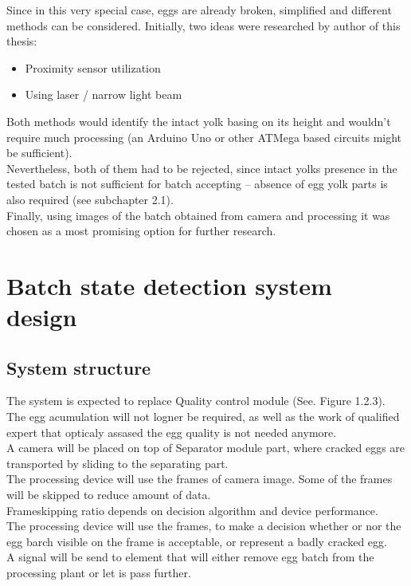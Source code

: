 \documentclass[12pt,twoside,a4paper]{article}
\begin{document}
Since in this very special case, eggs are already broken, simplified and different methods can be considered.
Initially, two ideas were researched by author of this thesis:
\begin{itemize}
\item Proximity sensor utilization
\item Using laser / narrow light beam 
\end{itemize}
Both methods would identify the intact yolk basing on its height and wouldn’t require much processing (an Arduino Uno or other ATMega based circuits might be sufficient).\\
Nevertheless, both of them had to be rejected, since intact yolks presence in the tested batch is not sufficient for batch accepting – absence of egg yolk parts is also required (see subchapter 2.1).\\
Finally, using images of the batch obtained from camera and processing it was chosen as a most promising option for further research.









\section{Batch state detection system design}

\subsection{System structure}
The system is expected to replace Quality control module (See. Figure 1.2.3).\\
The egg acumulation will not logner be required, as well as the work of qualified expert that opticaly assased the egg quality is not needed anymore.\\

A camera will be placed on top of Separator module part, where cracked eggs are transported by sliding to the separating part.\\

The processing device will use the frames of camera image. Some of the frames will be skipped to reduce amount of data.\\
Frameskipping ratio depends on decision algorithm and device performance.\\

The processing device will use the frames, to make a decision whether or nor the egg barch visible on the frame is acceptable, or represent a badly cracked egg.\\
A signal will be send to element that will either remove egg batch from the processing plant or let is pass further.\\
\end{document}
